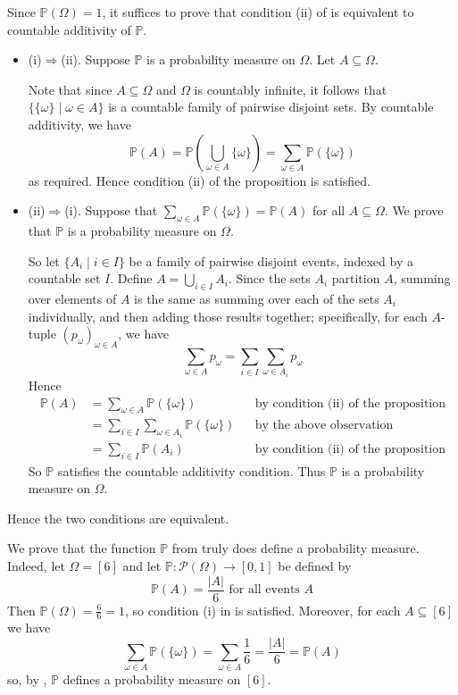 \begin{cproof}
Since $\mathbb{P}(\Omega)=1$, it suffices to prove that condition (ii) of  is equivalent to countable additivity of $\mathbb{P}$.

\begin{itemize}
\item (i)$\Rightarrow$(ii). Suppose $\mathbb{P}$ is a probability measure on $\Omega$. Let $A \subseteq \Omega$.

Note that since $A \subseteq \Omega$ and $\Omega$ is countably infinite, it follows that $\{ \{ \omega \} \mid \omega \in A \}$ is a countable family of pairwise disjoint sets. By countable additivity, we have
\[ \mathbb{P}(A) = \mathbb{P}\left( \bigcup_{\omega \in A} \{ \omega \} \right) = \sum_{\omega \in A} \mathbb{P}(\{\omega\}) \]
as required. Hence condition (ii) of the proposition is satisfied.

\item (ii)$\Rightarrow$(i). Suppose that $\sum_{\omega \in A} \mathbb{P}(\{\omega\}) = \mathbb{P}(A)$ for all $A \subseteq \Omega$. We prove that $\mathbb{P}$ is a probability measure on $\Omega$.

So let $\{ A_i \mid i \in I \}$ be a family of pairwise disjoint events, indexed by a countable set $I$. Define $A = \bigcup_{i \in I} A_i$. Since the sets $A_i$ partition $A$, summing over elements of $A$ is the same as summing over each of the sets $A_i$ individually, and then adding those results together; specifically, for each $A$-tuple $(p_{\omega})_{\omega \in A}$, we have
\[ \sum_{\omega \in A} p_{\omega} = \sum_{i \in I} \sum_{\omega \in A_i} p_{\omega} \]
Hence
\begin{align*}
\mathbb{P}(A) &= \sum_{\omega \in A} \mathbb{P}(\{\omega\}) && \text{by condition (ii) of the proposition} \\
&= \sum_{i \in I} \sum_{\omega \in A_i} \mathbb{P}(\{\omega\}) && \text{by the above observation} \\
&= \sum_{i \in I} \mathbb{P}(A_i) && \text{by condition (ii) of the proposition}
\end{align*}
So $\mathbb{P}$ satisfies the countable additivity condition. Thus $\mathbb{P}$ is a probability measure on $\Omega$.
\end{itemize}
Hence the two conditions are equivalent.
\end{cproof}

\begin{example}
\label{exProbabilitySpaceSixSidedDieVerifyMeasure}
We prove that the function $\mathbb{P}$ from  truly does define a probability measure. Indeed, let $\Omega=[6]$ and let $\mathbb{P} : \mathcal{P}(\Omega) \to [0,1]$ be defined by
\[ \mathbb{P}(A) = \frac{|A|}{6} \text{ for all events } A \]
Then $\mathbb{P}(\Omega) = \frac{6}{6} = 1$, so condition (i) in  is satisfied. Moreover, for each $A \subseteq [6]$ we have
\[ \sum_{\omega \in A} \mathbb{P}(\{\omega\}) = \sum_{\omega \in A} \frac{1}{6} = \frac{|A|}{6} = \mathbb{P}(A) \]
so, by , $\mathbb{P}$ defines a probability measure on $[6]$.
\end{example}

